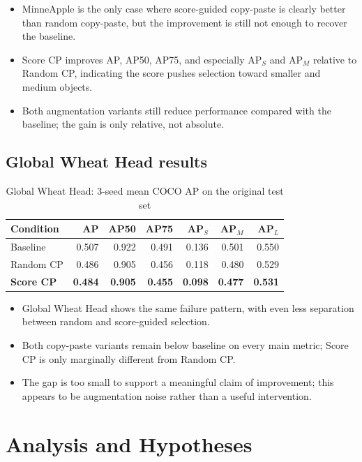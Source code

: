 \documentclass[11pt, a4paper]{article}
\begin{document}
\begin{itemize}
\item MinneApple is the only case where score-guided copy-paste is clearly better than random copy-paste, but the improvement is still not enough to recover the baseline.
\item  Score CP improves AP, AP50, AP75, and especially AP$_S$ and AP$_M$ relative to Random CP, indicating the score pushes selection toward smaller and medium objects.
\item  Both augmentation variants still reduce performance compared with the baseline; the gain is only relative, not absolute.
\end{itemize}

\subsection{Global Wheat Head results}
\begin{table}[htbp]
\centering
\small
\setlength{\tabcolsep}{4pt}
\caption{Global Wheat Head: 3-seed mean COCO AP on the original test set}
\label{tab:gwhd_results}
\begin{tabular}{lrrrrrr}
\toprule
Condition & AP & AP50 & AP75 & AP$_S$ & AP$_M$ & AP$_L$ \\
\midrule
Baseline & 0.507 & 0.922 & 0.491 & 0.136 & 0.501 & 0.550 \\
Random CP & 0.486 & 0.905 & 0.456 & 0.118 & 0.480 & 0.529 \\
\textbf{Score CP} & \textbf{0.484} & \textbf{0.905} & \textbf{0.455} & \textbf{0.098} & \textbf{0.477} & \textbf{0.531} \\
\bottomrule
\end{tabular}%
\end{table}

\begin{itemize}
\item  Global Wheat Head shows the same failure pattern, with even less separation between random and score-guided selection.
\item  Both copy-paste variants remain below baseline on every main metric; Score CP is only marginally different from Random CP.
\item  The gap is too small to support a meaningful claim of improvement; this appears to be augmentation noise rather than a useful intervention.
\end{itemize}

\section{Analysis and Hypotheses}
\end{document}

